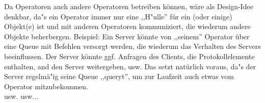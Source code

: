 Da Operatoren auch andere Operatoren betreiben k\"onnen, w\"are als
Design-Idee denkbar, da"s ein Operator immer nur eine ,,H"ulle'' f\"ur
ein (oder einige) Objekt(e) ist und mit anderen Operatoren
kommuniziert, die wiederum andere Objekte beherbergen. Beispiel: Ein
Server k\"onnte von ,,seinem'' Operator \"uber eine Queue mit Befehlen
versorgt werden, die wiederum das Verhalten des Servers beeinflussen.
Der Server k\"onnte ggf. Anfragen des Clients, die Protokollelemente
enthalten, and den Server weitergeben, usw. Das setzt nat\"urlich
voraus, da"s der Server regelm\"a"ig seine Queue ,,queryt'', um zur
Laufzeit
auch etwas vom Operator mitzubekommen.\\
usw. usw...


